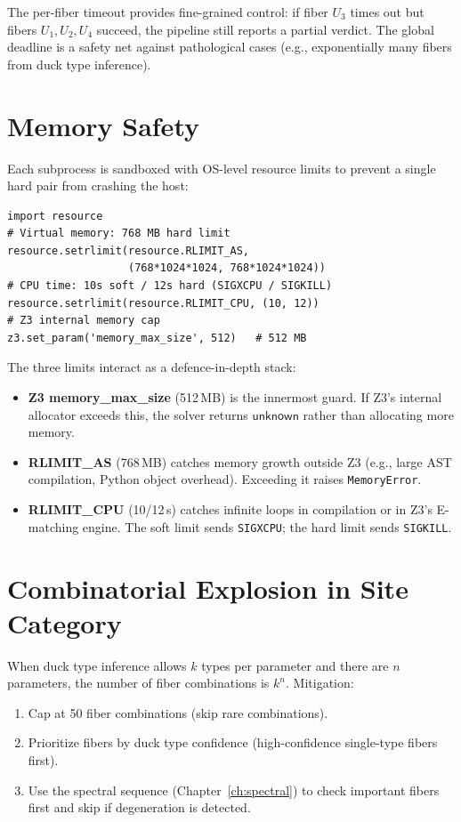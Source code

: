 \noindent
The per-fiber timeout provides fine-grained control: if fiber $U_3$
times out but fibers $U_1, U_2, U_4$ succeed, the pipeline still
reports a partial verdict.  The global deadline is a safety net
against pathological cases (e.g., exponentially many fibers from
duck type inference).

\section{Memory Safety}

Each subprocess is sandboxed with OS-level resource limits to
prevent a single hard pair from crashing the host:

\begin{lstlisting}[caption={Resource limits from \texttt{run\_benchmark.py}}]
import resource
# Virtual memory: 768 MB hard limit
resource.setrlimit(resource.RLIMIT_AS,
                   (768*1024*1024, 768*1024*1024))
# CPU time: 10s soft / 12s hard (SIGXCPU / SIGKILL)
resource.setrlimit(resource.RLIMIT_CPU, (10, 12))
# Z3 internal memory cap
z3.set_param('memory_max_size', 512)   # 512 MB
\end{lstlisting}

\noindent
The three limits interact as a defence-in-depth stack:
\begin{itemize}
  \item \textbf{Z3 memory\_max\_size} (512\,MB) is the innermost
    guard.  If Z3's internal allocator exceeds this, the solver
    returns $\mathsf{unknown}$ rather than allocating more memory.
  \item \textbf{RLIMIT\_AS} (768\,MB) catches memory growth outside
    Z3 (e.g., large AST compilation, Python object overhead).
    Exceeding it raises \texttt{MemoryError}.
  \item \textbf{RLIMIT\_CPU} (10/12\,s) catches infinite loops in
    compilation or in Z3's E-matching engine.  The soft limit
    sends \texttt{SIGXCPU}; the hard limit sends \texttt{SIGKILL}.
\end{itemize}

\section{Combinatorial Explosion in Site Category}

When duck type inference allows $k$ types per parameter and there
are $n$ parameters, the number of fiber combinations is $k^n$.
Mitigation:
\begin{enumerate}
  \item Cap at 50 fiber combinations (skip rare combinations).
  \item Prioritize fibers by duck type confidence (high-confidence
    single-type fibers first).
  \item Use the spectral sequence (Chapter~\ref{ch:spectral}) to
    check important fibers first and skip if degeneration is detected.
\end{enumerate}

